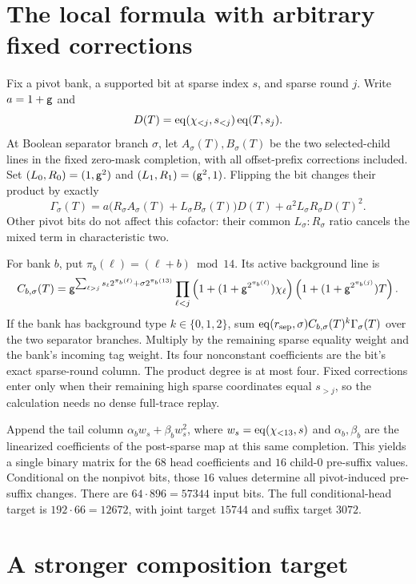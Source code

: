\documentclass[11pt]{article}
\begin{document}
\section{The local formula with arbitrary fixed corrections}

Fix a pivot bank, a supported bit at sparse index $s$, and sparse round $j$. Write $a=1+\mathsf{g}$ and
\[
 D(T)=\operatorname{eq}(\chi_{<j},s_{<j})\operatorname{eq}(T,s_j).
\]
At Boolean separator branch $\sigma$, let $A_\sigma(T),B_\sigma(T)$ be the two selected-child lines in the fixed zero-mask completion, with all offset-prefix corrections included. Set $(L_0,R_0)=(1,\mathsf{g}^2)$ and $(L_1,R_1)=(\mathsf{g}^2,1)$. Flipping the bit changes their product by exactly
\[
 \Gamma_\sigma(T)
 =a\bigl(R_\sigma A_\sigma(T)+L_\sigma B_\sigma(T)\bigr)D(T)
  +a^2L_\sigma R_\sigma D(T)^2.
\]
Other pivot bits do not affect this cofactor: their common $L_\sigma:R_\sigma$ ratio cancels the mixed term in characteristic two.

For bank $b$, put $\pi_b(\ell)=(\ell+b)\bmod14$. Its active background line is
\[
 C_{b,\sigma}(T)=
 \mathsf{g}^{\sum_{\ell>j}s_\ell2^{\pi_b(\ell)}+\sigma2^{\pi_b(13)}}
 \prod_{\ell<j}\left(1+(1+\mathsf{g}^{2^{\pi_b(\ell)}})\chi_\ell\right)
 \left(1+(1+\mathsf{g}^{2^{\pi_b(j)}})T\right).
\]
If the bank has background type $k\in\{0,1,2\}$, sum $\operatorname{eq}(r_{\rm sep},\sigma)C_{b,\sigma}(T)^k\Gamma_\sigma(T)$ over the two separator branches. Multiply by the remaining sparse equality weight and the bank's incoming tag weight. Its four nonconstant coefficients are the bit's exact sparse-round column. The product degree is at most four. Fixed corrections enter only when their remaining high sparse coordinates equal $s_{>j}$, so the calculation needs no dense full-trace replay.

Append the tail column $\alpha_bw_s+\beta_bw_s^2$, where $w_s=\operatorname{eq}(\chi_{<13},s)$ and $\alpha_b,\beta_b$ are the linearized coefficients of the post-sparse map at this same completion. This yields a single binary matrix for the $68$ head coefficients and $16$ child-$0$ pre-suffix values. Conditional on the nonpivot bits, those $16$ values determine all pivot-induced pre-suffix changes. There are $64\cdot896=57344$ input bits. The full conditional-head target is $192\cdot66=12672$, with joint target $15744$ and suffix target $3072$.

\section{A stronger composition target}
\end{document}
